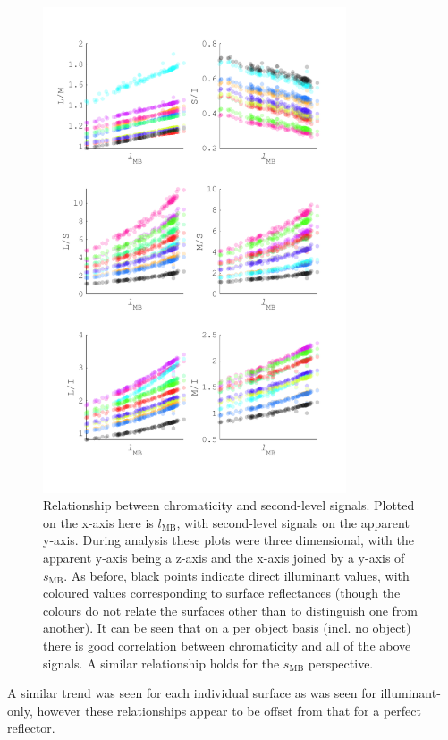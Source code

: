\begin{figure}
\includegraphics[max width=0.8\textwidth]{figs/comp/predictingChromaticity/allComboSignals.pdf}
\caption{Relationship between chromaticity and second-level signals. Plotted on the x-axis here is $l_{\text{MB}}$, with second-level signals on the apparent y-axis. During analysis these plots were three dimensional, with the apparent y-axis being a z-axis and the x-axis joined by a y-axis of $s_{\text{MB}}$. As before, black points indicate direct illuminant values, with coloured values corresponding to surface reflectances (though the colours do not relate the surfaces other than to distinguish one from another). It can be seen that on a per object basis (incl. no object) there is good correlation between chromaticity and all of the above signals. A similar relationship holds for the $s_{\text{MB}}$ perspective.}
\label{fig:allComboSignals}
\end{figure}

A similar trend was seen for each individual surface as was seen for illuminant-only, however these relationships appear to be offset from that for a perfect reflector.

